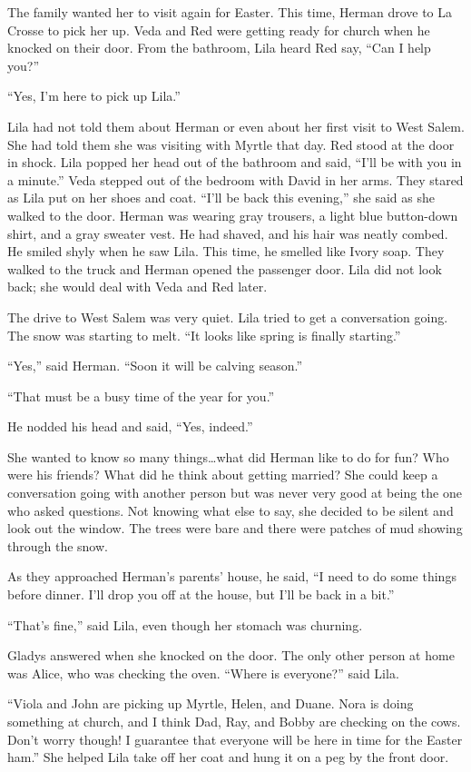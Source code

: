 \documentclass[
  american,
  letterpaper,
]{book}
\begin{document}
The family wanted her to visit again for Easter. This time, Herman drove
to La Crosse to pick her up. Veda and Red were getting ready for church
when he knocked on their door. From the bathroom, Lila heard Red say,
``Can I help you?''

``Yes, I'm here to pick up Lila.''

Lila had not told them about Herman or even about her first visit to
West Salem. She had told them she was visiting with Myrtle that day. Red
stood at the door in shock. Lila popped her head out of the bathroom and
said, ``I'll be with you in a minute.'' Veda stepped out of the bedroom
with David in her arms. They stared as Lila put on her shoes and coat.
``I'll be back this evening,'' she said as she walked to the door.
Herman was wearing gray trousers, a light blue button-down shirt, and a
gray sweater vest. He had shaved, and his hair was neatly combed. He
smiled shyly when he saw Lila. This time, he smelled like Ivory soap.
They walked to the truck and Herman opened the passenger door. Lila did
not look back; she would deal with Veda and Red later.

The drive to West Salem was very quiet. Lila tried to get a conversation
going. The snow was starting to melt. ``It looks like spring is finally
starting.''

``Yes,'' said Herman. ``Soon it will be calving season.''

``That must be a busy time of the year for you.''

He nodded his head and said, ``Yes, indeed.''

She wanted to know so many things\ldots what did Herman like to do for
fun? Who were his friends? What did he think about getting married? She
could keep a conversation going with another person but was never very
good at being the one who asked questions. Not knowing what else to say,
she decided to be silent and look out the window. The trees were bare
and there were patches of mud showing through the snow.

As they approached Herman's parents' house, he said, ``I need to do some
things before dinner. I'll drop you off at the house, but I'll be back
in a bit.''

``That's fine,'' said Lila, even though her stomach was churning.

Gladys answered when she knocked on the door. The only other person at
home was Alice, who was checking the oven. ``Where is everyone?'' said
Lila.

``Viola and John are picking up Myrtle, Helen, and Duane. Nora is doing
something at church, and I think Dad, Ray, and Bobby are checking on the
cows. Don't worry though! I guarantee that everyone will be here in time
for the Easter ham.'' She helped Lila take off her coat and hung it on a
peg by the front door.
\end{document}
